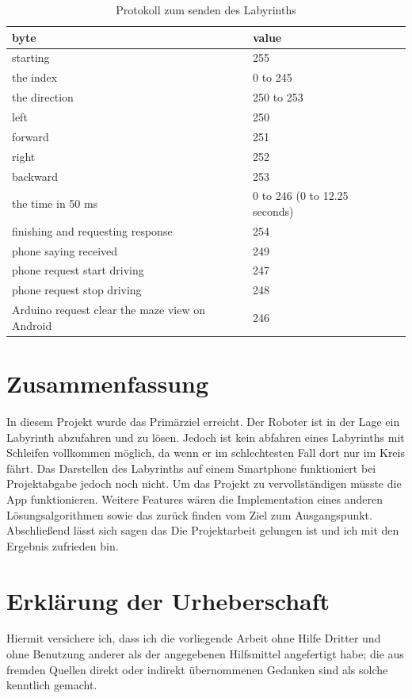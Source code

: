 \documentclass[12pt]{article}
\begin{document}
\begin{table}[h]
\caption{Protokoll zum senden des Labyrinths \label{tab:table_label}}
\begin{tabularx}{\columnwidth}{XXl}
  
  byte&value\\
  \hline
starting & 255\\
the index & 0 to 245\\
the direction & 250 to 253\\
left & 250\\
forward & 251\\
right & 252\\
backward & 253\\
the time  in 50 ms & 0 to 246 (0  to 12.25 seconds)\\
finishing and requesting response & 254\\
phone saying received & 249\\
phone request start driving & 247\\
phone request stop driving & 248\\
Arduino request clear the maze view on Android & 246\\
  
\end{tabularx}
\end{table}

\newpage
\section{Zusammenfassung} In diesem Projekt wurde das Primärziel erreicht. Der Roboter ist in der Lage ein Labyrinth abzufahren und zu lösen. Jedoch ist kein abfahren eines Labyrinths mit Schleifen vollkommen möglich, da wenn er im schlechtesten Fall dort nur im Kreis fährt. Das Darstellen des Labyrinths auf einem Smartphone funktioniert bei Projektabgabe jedoch noch nicht. Um das Projekt zu vervollständigen müsste die App funktionieren. Weitere Features wären die Implementation eines anderen Lösungsalgorithmen sowie das zurück finden vom Ziel zum Ausgangspunkt. Abschließend lässt sich sagen das Die Projektarbeit gelungen ist und ich mit den Ergebnis zufrieden bin.  

\section{Erklärung der Urheberschaft}

Hiermit versichere ich, dass ich die vorliegende Arbeit
ohne Hilfe Dritter und ohne Benutzung anderer als der angegebenen
Hilfsmittel angefertigt habe; die aus fremden Quellen direkt oder
indirekt übernommenen Gedanken sind als solche kenntlich gemacht.
\end{document}
